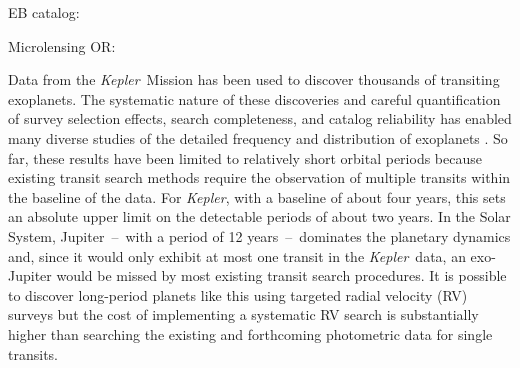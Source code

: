 \documentclass[manuscript, letterpaper]{aastex6}
\makeatletter
\let\origsection\section
\renewcommand\section{\@ifstar{\starsection}{\nostarsection}}
\newcommand\nostarsection[1]{\sectionprelude\origsection{#1}}
\newcommand\starsection[1]{\sectionprelude\origsection*{#1}}
\newcommand\sectionprelude{\vspace{1em}}
\newcommand{\project}[1]{\textsl{#1}}
\newcommand{\kepler}{\project{Kepler}}
\newcommand{\dd}{\ensuremath{\,\mathrm{d}}}
\makeatother
\begin{document}
\begin{abstract}

The \kepler\ Mission has discovered thousands of exoplanets and revolutionized
our understanding of their population.
This large, homogeneous catalog of discoveries has enabled rigorous studies of
the occurrence rate of exoplanets and planetary systems as a function of their
physical properties.
Transit surveys like \kepler\ are most sensitive to planets with shorter
orbital periods than the gas giant planets that dominate the dynamics of our
Solar System.
We performed a fully automated search for the transits of long-period
exoplanets in the archival \kepler\ light curves and announce XXX planet
candidates.
Since our method involves no human intervention, we empirically characterize
the completeness and reliability of our search.
Based on these results, we measure the average occurrence rate of exoplanets
smaller than Jupiter and with orbital periods longer than 700 days to be $\dd
N = YYY \pm ZZZ\dd \ln P \dd \ln R$.

\end{abstract}


\section{Introduction}

EB catalog: \citep{Kirk:2016}

Microlensing OR: \citep{Shvartzvald:2016}

Data from the \kepler\ Mission has been used to discover thousands of
transiting exoplanets.
The systematic nature of these discoveries and careful quantification of
survey selection effects, search completeness, and catalog reliability has
enabled many diverse studies of the detailed frequency and distribution of
exoplanets \citep[for example,][]{Howard:2012, Petigura:2013,
Foreman-Mackey:2014, Dressing:2015, Burke:2015, Mulders:2015}.
So far, these results have been limited to relatively short orbital periods
because existing transit search methods require the observation of multiple
transits within the baseline of the data.
For \kepler, with a baseline of about four years, this sets an absolute upper
limit on the detectable periods of about two years.
In the Solar System, Jupiter~--~with a period of 12 years~--~dominates the
planetary dynamics and, since it would only exhibit at most one transit in the
\kepler\ data, an exo-Jupiter would be missed by most existing transit search
procedures.
It is possible to discover long-period planets like this using targeted radial
velocity (RV) surveys \citep[for example][]{Butler:2006, Knutson:2014,
Bryan:2016} but the cost of implementing a systematic RV search is
substantially higher than searching the existing and forthcoming photometric
data for single transits.
\end{document}
